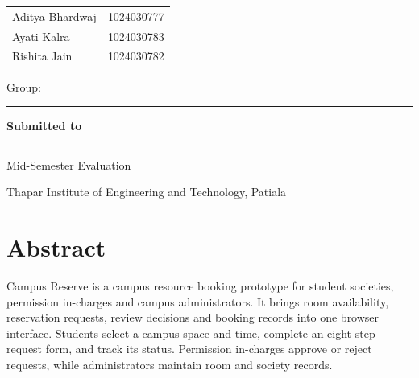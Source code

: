 \documentclass[11pt,a4paper]{report}
\begin{document}
\begin{titlepage}\centering
\vspace*{15mm}{\Large\bfseries UCS503 -- Software Engineering Lab\par}
\vspace{16mm}{\Huge\bfseries Campus Resource\par Management System\par}
\vspace{5mm}{\Large Campus Reserve\par}
\vspace{4mm}{\large Software Engineering Prototype Report\par}
\vspace{17mm}{\large\bfseries Submitted by\par}\vspace{4mm}
\begin{tabular}{ll}Aditya Bhardwaj & 1024030777\\Ayati Kalra & 1024030783\\Rishita Jain & 1024030782\end{tabular}
\vspace{7mm}\par Group: \rule{40mm}{0.4pt}
\vspace{15mm}\par{\large\bfseries Submitted to}\par\vspace{5mm}\rule{75mm}{0.4pt}
\vfill{\large Mid-Semester Evaluation\par}
\vspace{3mm}{\bfseries Computer Science and Engineering Department\par}
Thapar Institute of Engineering and Technology, Patiala\par
\vspace{6mm}{\small Repository-based prototype documentation\par September 2026}
\end{titlepage}
\tableofcontents\clearpage
\chapter*{Abstract}
Campus Reserve is a campus resource booking prototype for student societies, permission in-charges and campus administrators. It brings room availability, reservation requests, review decisions and booking records into one browser interface. Students select a campus space and time, complete an eight-step request form, and track its status. Permission in-charges approve or reject requests, while administrators maintain room and society records.
\end{document}
